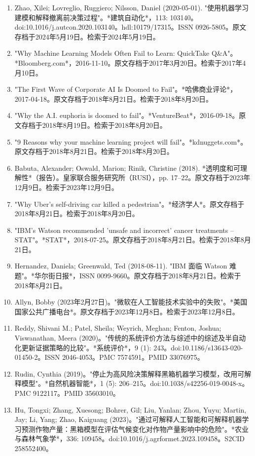 \begin{enumerate}
\item Zhao, Xilei; Lovreglio, Ruggiero; Nilsson, Daniel (2020-05-01). "使用机器学习建模和解释撤离前决策过程"。*建筑自动化*，113: 103140。doi:10.1016/j.autcon.2020.103140。hdl:10179/17315。ISSN 0926-5805。原文存档于2024年5月19日。检索于2024年5月19日。
\item "Why Machine Learning Models Often Fail to Learn: QuickTake Q&A"。*Bloomberg.com*，2016-11-10。原文存档于2017年3月20日。检索于2017年4月10日。
\item "The First Wave of Corporate AI Is Doomed to Fail"。*哈佛商业评论*，2017-04-18。原文存档于2018年8月21日。检索于2018年8月20日。
\item "Why the A.I. euphoria is doomed to fail"。*VentureBeat*，2016-09-18。原文存档于2018年8月19日。检索于2018年8月20日。
\item "9 Reasons why your machine learning project will fail"。*kdnuggets.com*。原文存档于2018年8月21日。检索于2018年8月20日。
\item Babuta, Alexander; Oswald, Marion; Rinik, Christine (2018). *透明度和可理解性*（报告）。皇家联合服务研究所（RUSI），pp. 17–22。原文存档于2023年12月9日。检索于2023年12月9日。
\item "Why Uber's self-driving car killed a pedestrian"。*经济学人*。原文存档于2018年8月21日。检索于2018年8月20日。
\item "IBM's Watson recommended 'unsafe and incorrect' cancer treatments – STAT"。*STAT*，2018-07-25。原文存档于2018年8月21日。检索于2018年8月21日。
\item Hernandez, Daniela; Greenwald, Ted (2018-08-11). "IBM 面临 Watson 难题"。*华尔街日报*，ISSN 0099-9660。原文存档于2018年8月21日。检索于2018年8月21日。
\item Allyn, Bobby (2023年2月27日)。"微软在人工智能技术实验中的失败"。*美国国家公共广播电台*。原文存档于2023年12月8日。检索于2023年12月8日。
\item Reddy, Shivani M.; Patel, Sheila; Weyrich, Meghan; Fenton, Joshua; Viswanathan, Meera (2020)。"传统的系统评价方法与综述中的综述及半自动化更新证据策略的比较"。*系统评价*，9 (1): 243。doi:10.1186/s13643-020-01450-2。ISSN 2046-4053。PMC 7574591。PMID 33076975。
\item Rudin, Cynthia (2019)。"停止为高风险决策解释黑箱机器学习模型，改用可解释模型"。*自然机器智能*，1 (5): 206–215。doi:10.1038/s42256-019-0048-x。PMC 9122117。PMID 35603010。
\item Hu, Tongxi; Zhang, Xuesong; Bohrer, Gil; Liu, Yanlan; Zhou, Yuyu; Martin, Jay; Li, Yang; Zhao, Kaiguang (2023)。"通过可解释人工智能和可解释机器学习预测作物产量：黑箱模型在评估气候变化对作物产量影响中的危险"。*农业与森林气象学*，336: 109458。doi:10.1016/j.agrformet.2023.109458。S2CID 258552400。

\end{enumerate}
